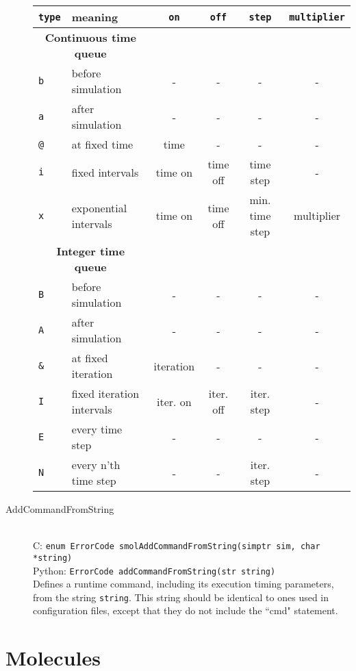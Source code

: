 \documentclass {book}
\newcommand {\ttt} {\texttt}
\begin{document}
\begin{description}
\begin{longtable}[c]{ll|cccc}
\ttt{type} & meaning & \ttt{on} & \ttt{off} & \ttt{step} & \ttt{multiplier}\\
\hline
\multicolumn{2}{c}{\textbf{Continuous time queue}}\\
\ttt{b} & before simulation & - & - & - & -\\
\ttt{a} & after simulation & - & - & - & -\\
\ttt{@} & at fixed time & time & - & - & -\\
\ttt{i} & fixed intervals & time on & time off & time step & -\\
\ttt{x} & exponential intervals & time on & time off & min. time step & multiplier\\
\hline
\multicolumn{2}{c}{\textbf{Integer time queue}}\\
\ttt{B} & before simulation & - & - & - & -\\
\ttt{A} & after simulation & - & - & - & -\\
\ttt{\&} & at fixed iteration & iteration & - & - & -\\
\ttt{I} & fixed iteration intervals & iter. on & iter. off & iter. step & -\\
\ttt{E} & every time step & - & - & - & -\\
\ttt{N} & every n'th time step & - & - & iter. step & -\\
\end{longtable}

\item[AddCommandFromString]
\hfill \\
C: \ttt{enum ErrorCode smolAddCommandFromString(simptr sim, char *string)}\\
Python: \ttt{ErrorCode addCommandFromString(str string)}\\
Defines a runtime command, including its execution timing parameters, from the string \ttt{string}. This string should be identical to ones used in configuration files, except that they do not include the ``cmd" statement.

\end{description}

\section{Molecules}
\end{document}

